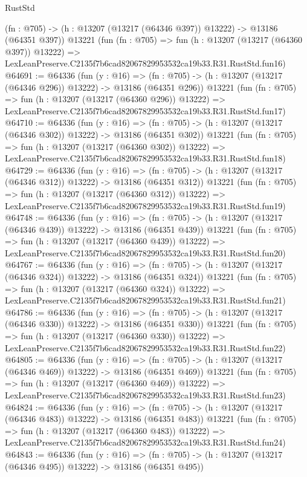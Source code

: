 \begin{lexlean}{RustStd}
\begin{coremodule}
    (fn : @705) -> (h : @13207 (@13217 (@64346 @397)) @13222) -> @13186 (@64351 @397))
    @13221
    (fun (fn : @705) =>
    fun (h : @13207 (@13217 (@64360 @397)) @13222) =>
    LexLeanPreserve.C2135f7b6cad82067829953532ca19b33.R31.RustStd.fun16)
@64691 := @64336
    (fun (y : @16) =>
    (fn : @705) -> (h : @13207 (@13217 (@64346 @296)) @13222) -> @13186 (@64351 @296))
    @13221
    (fun (fn : @705) =>
    fun (h : @13207 (@13217 (@64360 @296)) @13222) =>
    LexLeanPreserve.C2135f7b6cad82067829953532ca19b33.R31.RustStd.fun17)
@64710 := @64336
    (fun (y : @16) =>
    (fn : @705) -> (h : @13207 (@13217 (@64346 @302)) @13222) -> @13186 (@64351 @302))
    @13221
    (fun (fn : @705) =>
    fun (h : @13207 (@13217 (@64360 @302)) @13222) =>
    LexLeanPreserve.C2135f7b6cad82067829953532ca19b33.R31.RustStd.fun18)
@64729 := @64336
    (fun (y : @16) =>
    (fn : @705) -> (h : @13207 (@13217 (@64346 @312)) @13222) -> @13186 (@64351 @312))
    @13221
    (fun (fn : @705) =>
    fun (h : @13207 (@13217 (@64360 @312)) @13222) =>
    LexLeanPreserve.C2135f7b6cad82067829953532ca19b33.R31.RustStd.fun19)
@64748 := @64336
    (fun (y : @16) =>
    (fn : @705) -> (h : @13207 (@13217 (@64346 @439)) @13222) -> @13186 (@64351 @439))
    @13221
    (fun (fn : @705) =>
    fun (h : @13207 (@13217 (@64360 @439)) @13222) =>
    LexLeanPreserve.C2135f7b6cad82067829953532ca19b33.R31.RustStd.fun20)
@64767 := @64336
    (fun (y : @16) =>
    (fn : @705) -> (h : @13207 (@13217 (@64346 @324)) @13222) -> @13186 (@64351 @324))
    @13221
    (fun (fn : @705) =>
    fun (h : @13207 (@13217 (@64360 @324)) @13222) =>
    LexLeanPreserve.C2135f7b6cad82067829953532ca19b33.R31.RustStd.fun21)
@64786 := @64336
    (fun (y : @16) =>
    (fn : @705) -> (h : @13207 (@13217 (@64346 @330)) @13222) -> @13186 (@64351 @330))
    @13221
    (fun (fn : @705) =>
    fun (h : @13207 (@13217 (@64360 @330)) @13222) =>
    LexLeanPreserve.C2135f7b6cad82067829953532ca19b33.R31.RustStd.fun22)
@64805 := @64336
    (fun (y : @16) =>
    (fn : @705) -> (h : @13207 (@13217 (@64346 @469)) @13222) -> @13186 (@64351 @469))
    @13221
    (fun (fn : @705) =>
    fun (h : @13207 (@13217 (@64360 @469)) @13222) =>
    LexLeanPreserve.C2135f7b6cad82067829953532ca19b33.R31.RustStd.fun23)
@64824 := @64336
    (fun (y : @16) =>
    (fn : @705) -> (h : @13207 (@13217 (@64346 @483)) @13222) -> @13186 (@64351 @483))
    @13221
    (fun (fn : @705) =>
    fun (h : @13207 (@13217 (@64360 @483)) @13222) =>
    LexLeanPreserve.C2135f7b6cad82067829953532ca19b33.R31.RustStd.fun24)
@64843 := @64336
    (fun (y : @16) =>
    (fn : @705) -> (h : @13207 (@13217 (@64346 @495)) @13222) -> @13186 (@64351 @495))

\end{coremodule}
\end{lexlean}
